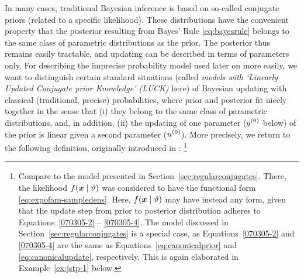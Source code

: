 In many cases, traditional Bayesian inference is based on so-called
conjugate priors (related to a specific likelihood). These
distributions have the convenient property that the posterior
resulting from Bayes' Rule \eqref{eq:bayesrule} belongs to the same class of parametric
distributions as the prior. The posterior thus remains easily
tractable, and updating can be described in terms of parameters
only. For describing the imprecise probability model used later on more easily, we want to
distinguish certain standard situations (called
\emph{models with `Linearly Updated Conjugate prior Knowledge'
(LUCK)} here) of Bayesian updating with classical (traditional, precise)
probabilities, where prior and posterior fit nicely together in the sense that
(i) they belong to the same class of parametric distributions, and, in addition,
(ii) the updating of one parameter ($y^{(0)}$ below) of the prior is
linear given a second parameter ($n^{(0)}$).
More precisely, we return to the following definition,
originally introduced in \textcite{Walter2007a}:%
\footnote{Compare to the model presented in Section~\ref{sec:regularconjugates}.
There, the likelihood $f({\bm x}\mid\vartheta)$ was considered to have the
functional form \eqref{eq:expofam-sampledens}.
Here, $f({\bm x}\mid\vartheta)$ may have instead any form,
given that the update step from prior to posterior distribution
adheres to Equations~\eqref{070305-2} -- \eqref{070305-4}.
The model discussed in Section~\ref{sec:regularconjugates} is a special case,
as Equations~\eqref{070305-2} and \eqref{070305-4} are the same as
Equations~\eqref{eq:canonicalprior} and \eqref{eq:canonicalupdate}, respectively.
This is again elaborated in Example~\ref{ex:jstp-1} below.}

